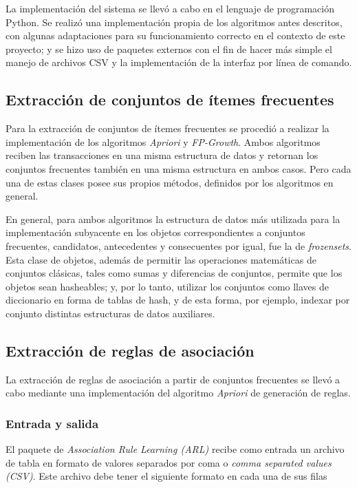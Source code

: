 La implementación del sistema se llevó a cabo en el lenguaje de programación Python. Se realizó una implementación propia de los algoritmos antes descritos, con algunas adaptaciones para su funcionamiento correcto en el contexto de este proyecto; y se hizo uso de paquetes externos con el fin de hacer más simple el manejo de archivos CSV y la implementación de la interfaz por línea de comando.

\subsection{Extracción de conjuntos de ítemes frecuentes}

Para la extracción de conjuntos de ítemes frecuentes se procedió a realizar la implementación de los algoritmos \textit{Apriori} y \textit{FP-Growth}. Ambos algoritmos reciben las transacciones en una misma estructura de datos y retornan los conjuntos frecuentes también en una misma estructura en ambos casos. Pero cada una de estas clases posee sus propios métodos, definidos por los algoritmos en general.

En general, para ambos algoritmos la estructura de datos más utilizada para la implementación subyacente en los objetos correspondientes a conjuntos frecuentes, candidatos, antecedentes y consecuentes por igual, fue la de \textit{frozensets}. Esta clase de objetos, además de permitir las operaciones matemáticas de conjuntos clásicas, tales como sumas y diferencias de conjuntos, permite que los objetos sean hasheables; y, por lo tanto, utilizar los conjuntos como llaves de diccionario en forma de tablas de hash, y de esta forma, por ejemplo, indexar por conjunto distintas estructuras de datos auxiliares.

\subsection{Extracción de reglas de asociación}

La extracción de reglas de asociación a partir de conjuntos frecuentes se llevó a cabo mediante una implementación del algoritmo \textit{Apriori} de generación de reglas.

\subsubsection{Entrada y salida}

El paquete de \textit{Association Rule Learning (ARL)} recibe como entrada un archivo de tabla en formato de valores separados por coma o \textit{comma separated values (CSV)}. Este archivo debe tener el siguiente formato en cada una de sus filas

